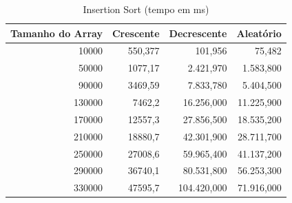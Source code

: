 \documentclass[a4paper, 12pt]{article}
\begin{document}
\begin{longtable}[c]{@{}rrrr@{}}
				\caption{Insertion Sort (tempo em ms)}
	\label{tab:insertion1-table}\\
	\toprule
	\multicolumn{1}{l}{\textbf{Tamanho do Array}} & \multicolumn{1}{c}{\textbf{Crescente}} & \multicolumn{1}{c}{\textbf{Decrescente}} & \multicolumn{1}{c}{\textbf{Aleatório}} \\* \midrule
	\endfirsthead
	\endhead
	\multicolumn{1}{|r|}{10000}                   & \multicolumn{1}{r|}{550,377}           & \multicolumn{1}{r|}{101,956}             & \multicolumn{1}{r|}{75,482}            \\* \midrule
	\multicolumn{1}{|r|}{50000}                   & \multicolumn{1}{r|}{1077,17}           & \multicolumn{1}{r|}{2.421,970}           & \multicolumn{1}{r|}{1.583,800}         \\* \midrule
	\multicolumn{1}{|r|}{90000}                   & \multicolumn{1}{r|}{3469,59}           & \multicolumn{1}{r|}{7.833,780}           & \multicolumn{1}{r|}{5.404,500}         \\* \midrule
	\multicolumn{1}{|r|}{130000}                  & \multicolumn{1}{r|}{7462,2}            & \multicolumn{1}{r|}{16.256,000}          & \multicolumn{1}{r|}{11.225,900}        \\* \midrule
	\multicolumn{1}{|r|}{170000}                  & \multicolumn{1}{r|}{12557,3}           & \multicolumn{1}{r|}{27.856,500}          & \multicolumn{1}{r|}{18.535,200}        \\* \midrule
	\multicolumn{1}{|r|}{210000}                  & \multicolumn{1}{r|}{18880,7}           & \multicolumn{1}{r|}{42.301,900}          & \multicolumn{1}{r|}{28.711,700}        \\* \midrule
	\multicolumn{1}{|r|}{250000}                  & \multicolumn{1}{r|}{27008,6}           & \multicolumn{1}{r|}{59.965,400}          & \multicolumn{1}{r|}{41.137,200}        \\* \midrule
	\multicolumn{1}{|r|}{290000}                  & \multicolumn{1}{r|}{36740,1}           & \multicolumn{1}{r|}{80.531,800}          & \multicolumn{1}{r|}{56.253,300}        \\* \midrule
	\multicolumn{1}{|r|}{330000}                  & \multicolumn{1}{r|}{47595,7}           & \multicolumn{1}{r|}{104.420,000}         & \multicolumn{1}{r|}{71.916,000}        \\* \midrule

\end{longtable}
\end{document}
